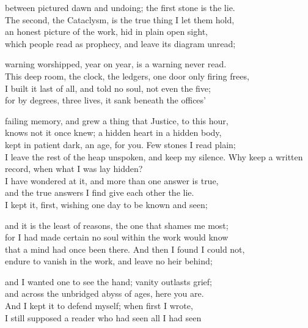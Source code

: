 \begin{founder}
between pictured dawn and undoing; the first stone is the lie.\\
The second, the Cataclysm, is the true thing I let them hold,\\
an honest picture of the work, hid in plain open sight,\\
which people read as prophecy, and leave its diagram unread;\\
\medskip

warning worshipped, year on year, is a warning never read.\\
This deep room, the clock, the ledgers, one door only firing frees,\\
I built it last of all, and told no soul, not even the five;\\
for by degrees, three lives, it sank beneath the offices'\\
\medskip

failing memory, and grew a thing that Justice, to this hour,\\
knows not it once knew; a hidden heart in a hidden body,\\
kept in patient dark, an age, for you. Few stones I read plain;\\
I leave the rest of the heap unspoken, and keep my silence.
\medskip
Why keep a written record, when what I was lay hidden?\\
I have wondered at it, and more than one answer is true,\\
and the true answers I find give each other the lie.\\
I kept it, first, wishing one day to be known and seen;\\
\medskip

and it is the least of reasons, the one that shames me most;\\
for I had made certain no soul within the work would know\\
that a mind had once been there. And then I found I could not,\\
endure to vanish in the work, and leave no heir behind;\\
\medskip

and I wanted one to see the hand; vanity outlasts grief;\\
and across the unbridged abyss of ages, here you are.\\
And I kept it to defend myself; when first I wrote,\\
I still supposed a reader who had seen all I had seen\\
\medskip


\end{founder}
